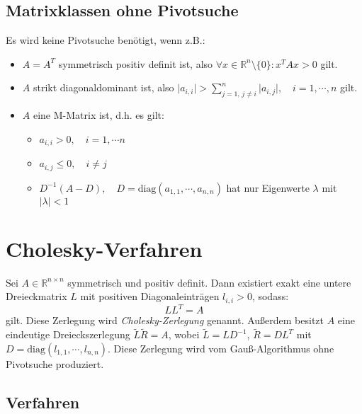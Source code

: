 \documentclass[a4paper, 11pt, accentcolor = tud3b]{tudreport}
\newcommand{\abs}[1]{\ensuremath{{\lvert #1 \rvert}}}
\newcommand{\R}{\ensuremath{\mathbb{R}}}
\begin{document}
	        \subsection{Matrixklassen ohne Pivotsuche}
		        Es wird keine Pivotsuche benötigt, wenn z.B.:
		        \begin{itemize}
		        	\item \( A = A^T \) symmetrisch positiv definit ist, also \( \forall x \in \R^n \setminus \{0\} : x^T A x > 0 \) gilt.
		        	\item \(A\) strikt diagonaldominant ist, also \( \abs{a_{i,i}} > \sum_{j = 1,\, j \neq i}^{n} \abs{a_{i,j}}, \quad i = 1, \cdots, n \) gilt.
		        	\item \(A\) eine M-Matrix ist, d.h. es gilt:
			        	\begin{itemize}
			        		\item \( a_{i,i} > 0, \quad i = 1, \cdots n \)
			        		\item \( a_{i,j} \leq 0, \quad i \neq j \)
			        		\item \( D^{-1} (A - D), \quad D = \textrm{diag}(a_{1,1}, \cdots, a_{n,n}) \) hat nur Eigenwerte \(\lambda\) mit \( \abs{\lambda} < 1 \)
			        	\end{itemize}
		        \end{itemize}
	
	    \section{Cholesky-Verfahren}
	        Sei \(A \in \R^{n \times n}\) symmetrisch und positiv definit. Dann existiert exakt eine untere Dreieckmatrix \(L\) mit positiven Diagonaleinträgen \( l_{i,i} > 0 \), sodass:
	        \begin{equation*}
		        LL^T = A
	        \end{equation*}
	        gilt. Diese Zerlegung wird \textit{Cholesky-Zerlegung} genannt. Außerdem besitzt \(A\) eine eindeutige Dreieckszerlegung \( \tilde{L}\tilde{R} = A \), wobei \( \tilde{L} = LD^{-1} \), \( \tilde{R} = DL^T \) mit \( D = \textrm{diag}(l_{1,1}, \cdots, l_{n,n}) \). Diese Zerlegung wird vom Gauß-Algorithmus ohne Pivotsuche produziert.
	
	        \subsection{Verfahren}
	            \begin{algorithm}[H]
	            \end{algorithm}
	
\end{document}
